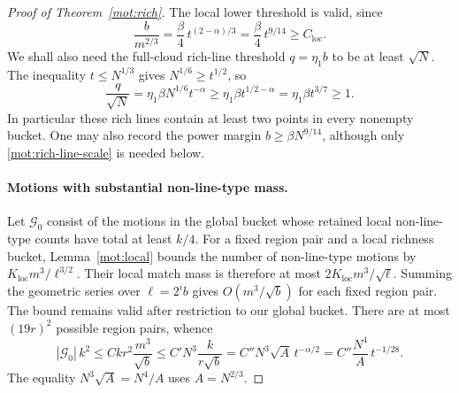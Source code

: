 \begin{proof}[Proof of Theorem~\ref{mot:rich}]
The local lower threshold is valid, since
\begin{equation}
\label{mot:local-scale-check}
 \frac{b}{m^{2/3}}
 =\frac\beta4\,t^{(2-\alpha)/3}
 =\frac\beta4\,t^{9/14}
 \ge C_{\mathrm{loc}}.
\end{equation}
We shall also need the full-cloud rich-line threshold
\(q=\eta_1b\) to be at least \(\sqrt N\).  The inequality
\(t\le N^{1/3}\) gives \(N^{1/6}\ge t^{1/2}\), so
\begin{equation}
\label{mot:rich-line-scale}
 \frac{q}{\sqrt N}
 =\eta_1\beta N^{1/6}t^{-\alpha}
 \ge\eta_1\beta t^{1/2-\alpha}
 =\eta_1\beta t^{3/7}\ge1.
\end{equation}
In particular these rich lines contain at least two points in every
nonempty bucket.  One may also record the power margin
\(b\ge\beta N^{9/14}\), although only
\eqref{mot:rich-line-scale} is needed below.

\paragraph{Motions with substantial non-line-type mass.}
Let \(\mathcal G_0\) consist of the motions in the global bucket
whose retained local non-line-type counts have total at least
\(k/4\).  For a fixed region pair and a local richness bucket,
Lemma~\ref{mot:local} bounds the number of non-line-type motions
by \(K_{\mathrm{loc}}m^3/\ell^{3/2}\).  Their local match mass
is therefore at most \(2K_{\mathrm{loc}}m^3/\sqrt\ell\).
Summing the geometric series over \(\ell=2^i b\) gives
\(O(m^3/\sqrt b)\) for each fixed region pair.  The bound remains
valid after restriction to our global bucket.  There are at most
\((19r)^2\) possible region pairs, whence
\begin{equation}
\label{mot:nonline-mass}
 |\mathcal G_0|\,k^2
 \le C k r^2\frac{m^3}{\sqrt b}
 \le C' N^3\frac{k}{r\sqrt b}
 =C''N^3\sqrt A\,t^{-\alpha/2}
 =C''\frac{N^4}{A}\,t^{-1/28}.
\end{equation}
The equality \(N^3\sqrt A=N^4/A\) uses \(A=N^{2/3}\).


\end{proof}
